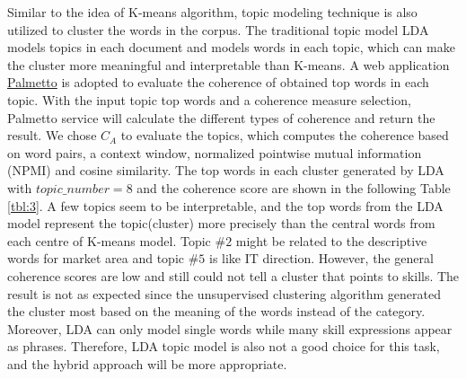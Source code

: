 Similar to the idea of K-means algorithm, topic modeling technique is also utilized to cluster the words in the corpus. The traditional topic model LDA models topics in each document and models words in each topic, which can make the cluster more meaningful and interpretable than K-means. A web application \href{https://palmetto.demos.dice-research.org}{Palmetto} is adopted to evaluate the coherence of obtained top words in each topic. With the input topic top words and a coherence measure selection, Palmetto service will calculate the different types of coherence and return the result. We chose $C_A$ to evaluate the topics, which computes the coherence based on word pairs, a context window, normalized pointwise mutual information (NPMI) and cosine similarity. The top words in each cluster generated by LDA with $topic\_number = 8$ and the coherence score are shown in the following Table \ref{tbl:3}. A few topics seem to be interpretable, and the top words from the LDA model represent the topic(cluster) more precisely than the central words from each centre of K-means model. Topic $\#2$ might be related to the descriptive words for market area and topic $\#5$ is like IT direction. However, the general coherence scores are low and still could not tell a cluster that points to skills. The result is not as expected since the unsupervised clustering algorithm generated the cluster most based on the meaning of the words instead of the category. Moreover, LDA can only model single words while many skill expressions appear as phrases. Therefore, LDA topic model is also not a good choice for this task, and the hybrid approach will be more appropriate.

